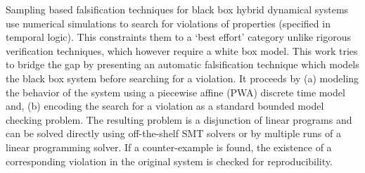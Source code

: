 Sampling based falsification techniques for black box hybrid dynamical
systems use numerical simulations to search for violations of
properties (specified in temporal logic). This constraints them to a
`best effort' category unlike rigorous verification techniques, which
however require a white box model. This work tries to bridge the gap
by presenting an automatic falsification technique which models the
black box system before searching for a violation. It proceeds by (a)
modeling the behavior of the system using a piecewise affine (PWA)
discrete time model and, (b) encoding the search for a violation as a
standard bounded model checking problem. The resulting problem is a
disjunction of linear programs and can be solved directly using
off-the-shelf SMT solvers or by multiple runs of a linear programming
solver. If a counter-example is found, the existence of a
corresponding violation in the original system is checked for
reproducibility.


